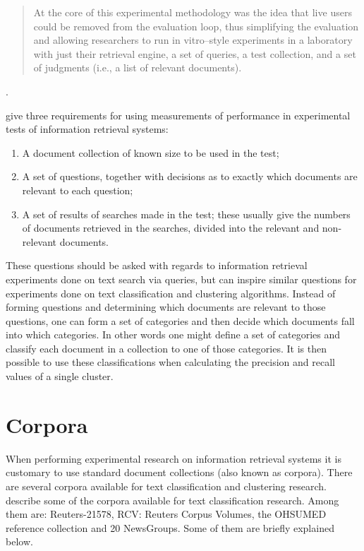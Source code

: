\begin{quote}
At the core of this experimental methodology was the idea that live users could be removed from the evaluation loop, thus simplifying the evaluation and allowing researchers to run in vitro–style experiments in a laboratory with just their retrieval engine, a set of queries, a test collection, and a set of judgments (i.e., a list of relevant documents).
\end{quote}.

\cite[p. 33]{Cleverdon1966} give three requirements for using measurements of performance in experimental tests of information retrieval systems:
\begin{enumerate}
\item A document collection of known size to be used in the test;
\item A set of questions, together with decisions as to exactly which documents are relevant to each question;
\item A set of results of searches made in the test; these usually give the numbers of documents retrieved in the searches, divided into the relevant and non-relevant documents.
\end{enumerate}
These questions should be asked with regards to information retrieval experiments done on text search via queries, but can inspire similar questions for experiments done on text classification and clustering algorithms. Instead of forming questions and determining which documents are relevant to those questions, one can form a set of categories and then decide which documents fall into which categories. In other words one might define a set of categories and classify each document in a collection to one of those categories. It is then possible to use these classifications when calculating the precision and recall values of a single cluster.

\section{Corpora}
\label{Corpora}

When performing experimental research on information retrieval systems it is customary to use standard document collections (also known as corpora). There are several corpora available for text classification and clustering research. \cite{Baeza-Yates2011a} describe some of the corpora available for text classification research. Among them are: Reuters-21578, RCV: Reuters Corpus Volumes, the OHSUMED reference collection and 20 NewsGroups. Some of them are briefly explained below.

